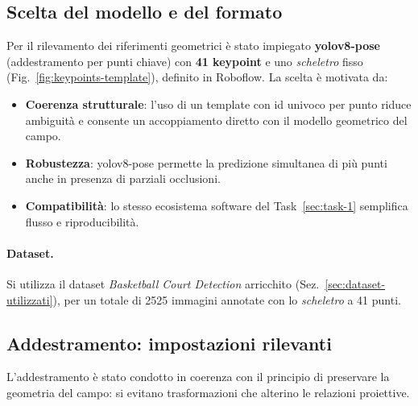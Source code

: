 \documentclass[12pt,a4paper,openright,twoside]{book}
\begin{document}
\subsection{Scelta del modello e del formato}
\label{subsec:scelta-modello-keypoints}

Per il rilevamento dei riferimenti geometrici è stato impiegato \textbf{\ac{yolo}v8-pose}
(addestramento per punti chiave) con \textbf{41 keypoint} e uno \emph{scheletro} fisso
(Fig.~\ref{fig:keypoints-template}), definito in Roboflow.
La scelta è motivata da:
\begin{itemize}
  \item \textbf{Coerenza strutturale}: l'uso di un template con \ac{id} univoco per punto
  riduce ambiguità e consente un accoppiamento diretto con il modello geometrico del campo.
  \item \textbf{Robustezza}: \ac{yolo}v8-pose permette la predizione simultanea di più punti anche in presenza di parziali occlusioni.
  \item \textbf{Compatibilità}: lo stesso ecosistema software del Task~\ref{sec:task-1} semplifica flusso e riproducibilità.
\end{itemize}

\paragraph{Dataset.}
Si utilizza il dataset \emph{Basketball Court Detection} arricchito (Sez.~\ref{sec:dataset-utilizzati}),
per un totale di 2525 immagini annotate con lo \emph{scheletro} a 41 punti.

\subsection{Addestramento: impostazioni rilevanti}
\label{subsec:train-keypoints}

L'addestramento è stato condotto in coerenza con il principio di preservare la
geometria del campo: si evitano trasformazioni che alterino le relazioni
proiettive.
\end{document}
